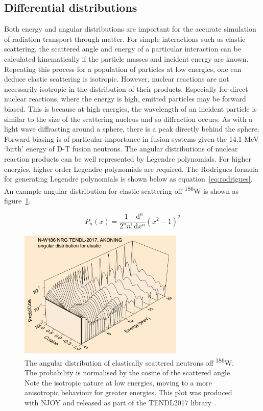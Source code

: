 \subsection{Differential distributions}
Both energy and angular distributions are important for the accurate simulation of radiation transport through matter. For simple interactions such as elastic scattering, the scattered angle and energy of a particular interaction can be calculated kinematically if the particle masses and incident energy are known. Repeating this process for a population of particles at low energies, one can deduce elastic scattering is isotropic. However, nuclear reactions are not necessarily isotropic in the distribution of their products. Especially for direct nuclear reactions, where the energy is high, emitted particles may be forward biased. This is because at high energies, the wavelength of an incident particle is similar to the size of the scattering nucleus and so diffraction occurs. As with a light wave diffracting around a sphere, there is a peak directly behind the sphere. Forward biasing is of particular importance in fusion systems given the 14.1 MeV `birth' energy of D-T fusion neutrons. The angular distributions of nuclear reaction products can be well represented by Legendre polynomials. For higher energies, higher order Legendre polynomials are required. The Rodrigues formula for generating Legendre polynomials is shown below as equation~\ref{eq:rodrigues}. An example angular distribution for elastic scattering off \textsuperscript{186}W is shown as figure~\ref{fig:tungsten_scatter}.

\begin{equation}
  P_{n}(x) = \frac{1}{2^{n}n!} \frac{\mathrm{d}^{n}}{\mathrm{d}x^{n}} (x^{2} - 1)^{2}
  \label{eq:rodrigues}
\end{equation}

\begin{figure}[ht]
  \includegraphics[width=0.7\textwidth]{tungsten_scatter}
  \caption{The angular distribution of elastically scattered neutrons off \textsuperscript{186}W. The probability is normalised by the cosine of the scattered angle. Note the isotropic nature at low energies, moving to a more anisotropic behaviour for greater energies. This plot was produced with NJOY \cite{MacFarlane2010} and released as part of the TENDL2017 library \cite{Rochman2016}.}
  \label{fig:tungsten_scatter}
\end{figure}

